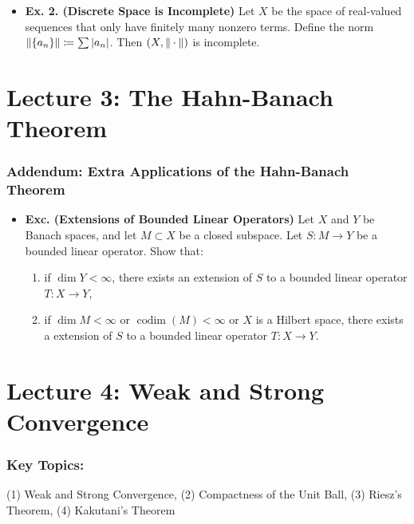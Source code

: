 \documentclass{article}
\def\xmax{1}\def\ymax{1.2}
\begin{document}
\begin{itemize}
\begin{figure}[h!]
		\caption{Approximation of a non-smooth function by smooth functions. Note that the red function should be supported in $[0,1]$.}
		\label{fig:cinfty_not_complete}
	\end{figure}
	\item \textbf{Ex. 2. (Discrete Space is Incomplete)} Let $X$ be the space of real-valued sequences that only have finitely many nonzero terms. Define the norm $\left\Vert \{a_{n}\} \right\Vert \coloneqq \sum \left| a_{n} \right|$. Then $(X, \left\Vert \hspace{2pt}\cdot\hspace{2pt} \right\Vert)$ is incomplete. 
\end{itemize}
	
	
	
\newpage 
\section{Lecture 3: The Hahn-Banach Theorem}
\subsubsection{Addendum: Extra Applications of the Hahn-Banach Theorem}
\begin{itemize}
	\item \textbf{Exc. (Extensions of Bounded Linear Operators)} Let $X$ and $Y$ be Banach spaces, and let $M \subset X$ be a closed subspace. Let $S: M \to Y$ be a bounded linear operator. Show that: 
		\begin{enumerate}[itemsep =-2pt,label =(\arabic{*})]
			\item if $\dim{Y} < \infty$, there exists an extension of $S$ to a bounded linear operator $T: X \to Y$, 
			\item if $\dim{M} < \infty$ or $\operatorname{codim}(M) < \infty$ or $X$ is a Hilbert space, there exists a extension of $S$ to a bounded linear operator $T: X \to Y$. 
		\end{enumerate}
\end{itemize}


\newpage 
\section{Lecture 4: Weak and Strong Convergence}
\subsubsection{Key Topics:}
(1) Weak and Strong Convergence, (2) Compactness of the Unit Ball, (3) Riesz's Theorem, (4) Kakutani's Theorem 
\end{document}
